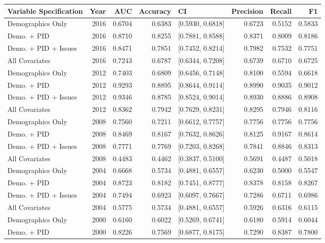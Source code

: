 \begin{longtable}{lrrrlrrr}
  \toprule
Variable Specification & Year & AUC & Accuracy & CI & Precision & Recall & F1 \\ 
  \midrule
Demographics Only & 2016 & 0.6704 & 0.6383 & [0.5930, 0.6818] & 0.6723 & 0.5152 & 0.5833 \\ 
  Demo. + PID & 2016 & 0.8710 & 0.8255 & [0.7881, 0.8588] & 0.8371 & 0.8009 & 0.8186 \\ 
  Demo. + PID + Issues & 2016 & 0.8471 & 0.7851 & [0.7452, 0.8214] & 0.7982 & 0.7532 & 0.7751 \\ 
  All Covariates & 2016 & 0.7243 & 0.6787 & [0.6344, 0.7208] & 0.6739 & 0.6710 & 0.6725 \\ 
  Demographics Only & 2012 & 0.7403 & 0.6809 & [0.6456, 0.7148] & 0.8100 & 0.5594 & 0.6618 \\ 
  Demo. + PID & 2012 & 0.9293 & 0.8895 & [0.8644, 0.9114] & 0.8990 & 0.9035 & 0.9012 \\ 
  Demo. + PID + Issues & 2012 & 0.9346 & 0.8785 & [0.8524, 0.9014] & 0.8930 & 0.8886 & 0.8908 \\ 
  All Covariates & 2012 & 0.8362 & 0.7942 & [0.7629, 0.8231] & 0.8295 & 0.7946 & 0.8116 \\ 
  Demographics Only & 2008 & 0.7560 & 0.7211 & [0.6612, 0.7757] & 0.7756 & 0.7756 & 0.7756 \\ 
  Demo. + PID & 2008 & 0.8469 & 0.8167 & [0.7632, 0.8626] & 0.8125 & 0.9167 & 0.8614 \\ 
  Demo. + PID + Issues & 2008 & 0.7771 & 0.7769 & [0.7203, 0.8268] & 0.7841 & 0.8846 & 0.8313 \\ 
  All Covariates & 2008 & 0.4483 & 0.4462 & [0.3837, 0.5100] & 0.5691 & 0.4487 & 0.5018 \\ 
  Demographics Only & 2004 & 0.6668 & 0.5734 & [0.4881, 0.6557] & 0.6230 & 0.5000 & 0.5547 \\ 
  Demo. + PID & 2004 & 0.8723 & 0.8182 & [0.7451, 0.8777] & 0.8378 & 0.8158 & 0.8267 \\ 
  Demo. + PID + Issues & 2004 & 0.7494 & 0.6923 & [0.6097, 0.7667] & 0.7286 & 0.6711 & 0.6986 \\ 
  All Covariates & 2004 & 0.5775 & 0.5734 & [0.4881, 0.6557] & 0.5926 & 0.6316 & 0.6115 \\ 
  Demographics Only & 2000 & 0.6160 & 0.6022 & [0.5269, 0.6741] & 0.6180 & 0.5914 & 0.6044 \\ 
  Demo. + PID & 2000 & 0.8226 & 0.7569 & [0.6877, 0.8175] & 0.7290 & 0.8387 & 0.7800 \\ 

\end{longtable}
